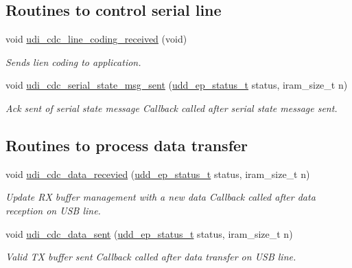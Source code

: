\subsection*{\-Routines to control serial line}
\begin{DoxyCompactItemize}
\item 
void \hyperlink{group__udi__cdc__group_gab674a6567bc8b0da4afa5add7c361c00}{udi\-\_\-cdc\-\_\-line\-\_\-coding\-\_\-received} (void)
\begin{DoxyCompactList}\small\item\em \-Sends lien coding to application. \end{DoxyCompactList}\item 
void \hyperlink{group__udi__cdc__group_gaec142bc6fba06ca35a45d33f31840db7}{udi\-\_\-cdc\-\_\-serial\-\_\-state\-\_\-msg\-\_\-sent} (\hyperlink{group__udd__group_gac0f77f5a0e085af1242b48fd1054959a}{udd\-\_\-ep\-\_\-status\-\_\-t} status, iram\-\_\-size\-\_\-t n)
\begin{DoxyCompactList}\small\item\em \-Ack sent of serial state message \-Callback called after serial state message sent. \end{DoxyCompactList}\end{DoxyCompactItemize}
\subsection*{\-Routines to process data transfer}
\begin{DoxyCompactItemize}
\item 
void \hyperlink{group__udi__cdc__group_gaa720107e691aac776090aabc23884eb6}{udi\-\_\-cdc\-\_\-data\-\_\-recevied} (\hyperlink{group__udd__group_gac0f77f5a0e085af1242b48fd1054959a}{udd\-\_\-ep\-\_\-status\-\_\-t} status, iram\-\_\-size\-\_\-t n)
\begin{DoxyCompactList}\small\item\em \-Update \-R\-X buffer management with a new data \-Callback called after data reception on \-U\-S\-B line. \end{DoxyCompactList}\item 
void \hyperlink{group__udi__cdc__group_gac8eef4d87000686e33f73efda71c6e10}{udi\-\_\-cdc\-\_\-data\-\_\-sent} (\hyperlink{group__udd__group_gac0f77f5a0e085af1242b48fd1054959a}{udd\-\_\-ep\-\_\-status\-\_\-t} status, iram\-\_\-size\-\_\-t n)
\begin{DoxyCompactList}\small\item\em \-Valid \-T\-X buffer sent \-Callback called after data transfer on \-U\-S\-B line. \end{DoxyCompactList}\end{DoxyCompactItemize}
